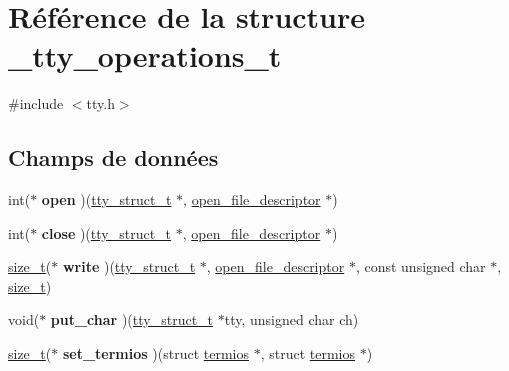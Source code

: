\hypertarget{struct__tty__operations__t}{\section{\-Référence de la structure \-\_\-tty\-\_\-operations\-\_\-t}
\label{struct__tty__operations__t}
}


{\ttfamily \#include $<$tty.\-h$>$}

\subsection*{\-Champs de données}
\begin{DoxyCompactItemize}
\item 
\hypertarget{struct__tty__operations__t_a44fb314b6ba47294932a8fdfe8e25d63}{int($\ast$ {\bfseries open} )(\hyperlink{tty_8h_a0870504b9f2d2e99a669e6df3dc9e84e}{tty\-\_\-struct\-\_\-t} $\ast$, \hyperlink{struct__open__file__descriptor}{open\-\_\-file\-\_\-descriptor} $\ast$)}\label{struct__tty__operations__t_a44fb314b6ba47294932a8fdfe8e25d63}

\item 
\hypertarget{struct__tty__operations__t_a9277a33599caf8b99b1f4ba52708a117}{int($\ast$ {\bfseries close} )(\hyperlink{tty_8h_a0870504b9f2d2e99a669e6df3dc9e84e}{tty\-\_\-struct\-\_\-t} $\ast$, \hyperlink{struct__open__file__descriptor}{open\-\_\-file\-\_\-descriptor} $\ast$)}\label{struct__tty__operations__t_a9277a33599caf8b99b1f4ba52708a117}

\item 
\hypertarget{struct__tty__operations__t_a2b53188048a05fa70f02311f48b6d877}{\hyperlink{types_8h_a29d85914ddff32967d85ada69854206d}{size\-\_\-t}($\ast$ {\bfseries write} )(\hyperlink{tty_8h_a0870504b9f2d2e99a669e6df3dc9e84e}{tty\-\_\-struct\-\_\-t} $\ast$, \hyperlink{struct__open__file__descriptor}{open\-\_\-file\-\_\-descriptor} $\ast$, const unsigned char $\ast$, \hyperlink{types_8h_a29d85914ddff32967d85ada69854206d}{size\-\_\-t})}\label{struct__tty__operations__t_a2b53188048a05fa70f02311f48b6d877}

\item 
\hypertarget{struct__tty__operations__t_aa6245586b6d4d0fb23f2afe2ea6e6672}{void($\ast$ {\bfseries put\-\_\-char} )(\hyperlink{tty_8h_a0870504b9f2d2e99a669e6df3dc9e84e}{tty\-\_\-struct\-\_\-t} $\ast$tty, unsigned char ch)}\label{struct__tty__operations__t_aa6245586b6d4d0fb23f2afe2ea6e6672}

\item 
\hypertarget{struct__tty__operations__t_a635940084e0140e5b859572d4b1cb647}{\hyperlink{types_8h_a29d85914ddff32967d85ada69854206d}{size\-\_\-t}($\ast$ {\bfseries set\-\_\-termios} )(struct \hyperlink{structtermios}{termios} $\ast$, struct \hyperlink{structtermios}{termios} $\ast$)}\label{struct__tty__operations__t_a635940084e0140e5b859572d4b1cb647}


\end{DoxyCompactItemize}
